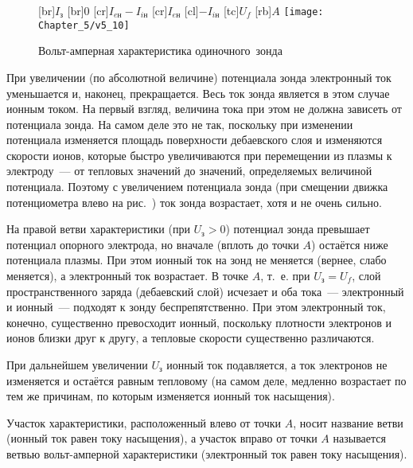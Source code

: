 \begin{wrapfigure}{o}{0.5\textwidth}
	[br]{$I_з$}
	[br]{0}
	[cr]{$I_{eн}-I_{iн}$}
	[cr]{$I_{eн}$}
	[cl]{$-I_{iн}$}
	[tc]{$U_f$}
	[rb]{$A$}
	\texttt{[image: Chapter\_5/v5\_10]}
	\caption{Вольт-амперная характеристика одиночного~зонда}
\end{wrapfigure}

При увеличении (по абсолютной величине) потенциала зонда электронный ток
уменьшается и, наконец, прекращается. Весь ток зонда является в этом случае ионным током. На первый взгляд, величина
тока при этом не должна зависеть от потенциала зонда. На самом деле это не так, поскольку при изменении потенциала
изменяется площадь поверхности дебаевского слоя и изменяются скорости ионов, которые быстро увеличиваются при
перемещении из плазмы к электроду~--- от тепловых значений до значений, определяемых величиной потенциала. Поэтому с
увеличением потенциала зонда (при смещении движка потенциометра влево на рис.~) ток зонда возрастает, хотя и не очень
сильно.

На правой ветви характеристики (при $U_\text{з}>0$) потенциал зонда превышает потенциал опорного электрода, но вначале (вплоть
до точки $A$) остаётся ниже потенциала плазмы. При этом ионный ток на зонд не меняется (вернее, слабо меняется), а
электронный ток возрастает. В точке $A$, т.~е. при $U_\text{з}=U_f$, слой пространственного заряда (дебаевский слой) исчезает и
оба тока~--- электронный и ионный~--- подходят к зонду беспрепятственно. При этом электронный ток, конечно, существенно
превосходит ионный, поскольку плотности электронов и ионов близки друг к другу, а тепловые скорости существенно
различаются.

При дальнейшем увеличении $U_з$ ионный ток подавляется, а ток электронов не изменяется и остаётся равным тепловому (на
самом деле, медленно возрастает по тем же причинам, по которым изменяется ионный ток насыщения).

Участок характеристики, расположенный влево от точки $A$, носит название  ветви (ионный ток равен току
насыщения), а участок вправо от точки $A$ называется  ветвью вольт-амперной характеристики
(электронный ток равен току насыщения).

